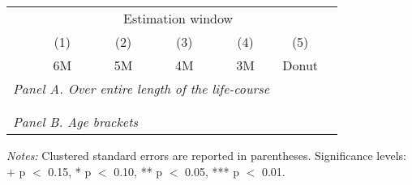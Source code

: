  \vspace*{\fill}
 \begin{table}[H] \centering 
 	\begin{threeparttable} \centering %
 	{\def\sym#1{\ifmmode^{#1}\else\(^{#1}\)\fi} 
 			\begin{tabular}{l*{6}{c}}
 				\toprule 
 				& \multicolumn{5}{c}{Estimation window} \\ 
 				\cmidrule(lr){2-6}
 				&\multicolumn{1}{c}{(1)}&\multicolumn{1}{c}{(2)}&\multicolumn{1}{c}{(3)}&\multicolumn{1}{c}{(4)}&\multicolumn{1}{c}{(5)}\\
 				&\multicolumn{1}{c}{6M}&\multicolumn{1}{c}{5M}&\multicolumn{1}{c}{4M}&\multicolumn{1}{c}{3M}&\multicolumn{1}{c}{Donut}\\
 				\midrule
 				\multicolumn{5}{l}{\emph{Panel A. Over entire length of the life-course}} \\
 				 \\ \\
 				\multicolumn{5}{l}{\emph{Panel B. Age brackets}} \\
 				    
 				\bottomrule 
 		\end{tabular}}
 		\begin{tablenotes} 
 				\item \tiny \emph{Notes:} Clustered standard errors are reported in parentheses. \newline Significance levels: $+$ p $<$ 0.15, * p $<$ 0.10, ** p $<$ 0.05, *** p $<$ 0.01.
 		\end{tablenotes} 
 	\end{threeparttable} 
 \end{table} 
\vspace*{\fill}\clearpage 